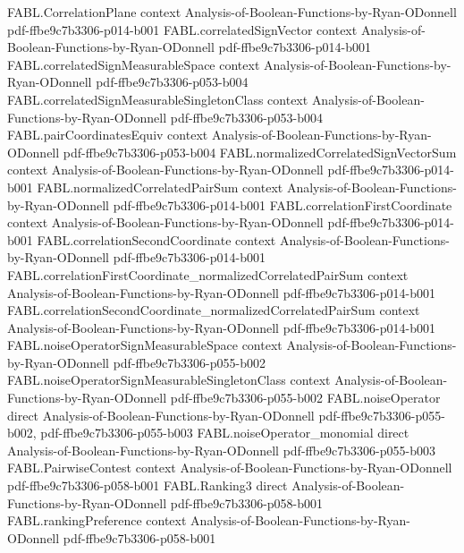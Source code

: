 \begin{theorem}
\proofstep
  {FABL.CorrelationPlane}
  {context}
  {Analysis-of-Boolean-Functions-by-Ryan-ODonnell}
  {pdf-ffbe9c7b3306-p014-b001}
\proofstep
  {FABL.correlatedSignVector}
  {context}
  {Analysis-of-Boolean-Functions-by-Ryan-ODonnell}
  {pdf-ffbe9c7b3306-p014-b001}
\proofstep
  {FABL.correlatedSignMeasurableSpace}
  {context}
  {Analysis-of-Boolean-Functions-by-Ryan-ODonnell}
  {pdf-ffbe9c7b3306-p053-b004}
\proofstep
  {FABL.correlatedSignMeasurableSingletonClass}
  {context}
  {Analysis-of-Boolean-Functions-by-Ryan-ODonnell}
  {pdf-ffbe9c7b3306-p053-b004}
\proofstep
  {FABL.pairCoordinatesEquiv}
  {context}
  {Analysis-of-Boolean-Functions-by-Ryan-ODonnell}
  {pdf-ffbe9c7b3306-p053-b004}
\proofstep
  {FABL.normalizedCorrelatedSignVectorSum}
  {context}
  {Analysis-of-Boolean-Functions-by-Ryan-ODonnell}
  {pdf-ffbe9c7b3306-p014-b001}
\proofstep
  {FABL.normalizedCorrelatedPairSum}
  {context}
  {Analysis-of-Boolean-Functions-by-Ryan-ODonnell}
  {pdf-ffbe9c7b3306-p014-b001}
\proofstep
  {FABL.correlationFirstCoordinate}
  {context}
  {Analysis-of-Boolean-Functions-by-Ryan-ODonnell}
  {pdf-ffbe9c7b3306-p014-b001}
\proofstep
  {FABL.correlationSecondCoordinate}
  {context}
  {Analysis-of-Boolean-Functions-by-Ryan-ODonnell}
  {pdf-ffbe9c7b3306-p014-b001}
\proofstep
  {FABL.correlationFirstCoordinate_normalizedCorrelatedPairSum}
  {context}
  {Analysis-of-Boolean-Functions-by-Ryan-ODonnell}
  {pdf-ffbe9c7b3306-p014-b001}
\proofstep
  {FABL.correlationSecondCoordinate_normalizedCorrelatedPairSum}
  {context}
  {Analysis-of-Boolean-Functions-by-Ryan-ODonnell}
  {pdf-ffbe9c7b3306-p014-b001}
\proofstep
  {FABL.noiseOperatorSignMeasurableSpace}
  {context}
  {Analysis-of-Boolean-Functions-by-Ryan-ODonnell}
  {pdf-ffbe9c7b3306-p055-b002}
\proofstep
  {FABL.noiseOperatorSignMeasurableSingletonClass}
  {context}
  {Analysis-of-Boolean-Functions-by-Ryan-ODonnell}
  {pdf-ffbe9c7b3306-p055-b002}
\proofstep
  {FABL.noiseOperator}
  {direct}
  {Analysis-of-Boolean-Functions-by-Ryan-ODonnell}
  {pdf-ffbe9c7b3306-p055-b002,
    pdf-ffbe9c7b3306-p055-b003}
\proofstep
  {FABL.noiseOperator_monomial}
  {direct}
  {Analysis-of-Boolean-Functions-by-Ryan-ODonnell}
  {pdf-ffbe9c7b3306-p055-b003}
\proofstep
  {FABL.PairwiseContest}
  {context}
  {Analysis-of-Boolean-Functions-by-Ryan-ODonnell}
  {pdf-ffbe9c7b3306-p058-b001}
\proofstep
  {FABL.Ranking3}
  {direct}
  {Analysis-of-Boolean-Functions-by-Ryan-ODonnell}
  {pdf-ffbe9c7b3306-p058-b001}
\proofstep
  {FABL.rankingPreference}
  {context}
  {Analysis-of-Boolean-Functions-by-Ryan-ODonnell}
  {pdf-ffbe9c7b3306-p058-b001}
\proofstep

\end{theorem}
